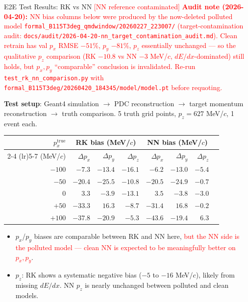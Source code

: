 \documentclass[aspectratio=169]{beamer}
\begin{document}
\begin{frame}{E2E Test Results: RK vs NN \textcolor{red}{[NN reference contaminated]}}
\small
\textcolor{red}{\textbf{Audit note (2026-04-20):} NN bias columns below were produced
by the now-deleted polluted model \texttt{formal\_B115T3deg\_qmdwindow/20260227\_223007/}
(target-contamination audit: \texttt{docs/audit/2026-04-20-nn\_target\_contamination\_audit.md}).
Clean retrain has val $p_x$ RMSE $-51\%$, $p_y$ $-81\%$, $p_z$ essentially unchanged ---
so the qualitative $p_z$ comparison (RK $-10.8$ vs NN $-3$ MeV/$c$, $dE/dx$-dominated) still
holds, but $p_x,p_y$ ``comparable'' conclusion is invalidated. Re-run
\texttt{test\_rk\_nn\_comparison.py} with
\texttt{formal\_B115T3deg/20260420\_184345/model/model.pt} before requoting.}

\textbf{Test setup}: Geant4 simulation $\to$ PDC reconstruction $\to$ target momentum reconstruction $\to$ truth comparison. 5 truth grid points, $p_z = 627$ MeV/$c$, 1 event each.

\begin{table}
\centering
\begin{tabular}{rrrrrrrr}
\toprule
$p_x^\mathrm{true}$ & \multicolumn{3}{c}{RK bias (MeV/$c$)} & \multicolumn{3}{c}{NN bias (MeV/$c$)} \\
\cmidrule(lr){2-4} \cmidrule(lr){5-7}
(MeV/$c$) & $\Delta p_x$ & $\Delta p_y$ & $\Delta p_z$ & $\Delta p_x$ & $\Delta p_y$ & $\Delta p_z$ \\
\midrule
$-100$ & $-7.3$ & $-13.4$ & $-16.1$ & $-6.2$ & $-13.0$ & $-5.4$ \\
$-50$ & $-20.4$ & $-25.5$ & $-10.8$ & $-20.5$ & $-24.9$ & $-0.7$ \\
$0$ & $3.3$ & $-3.9$ & $-13.1$ & $3.5$ & $-3.8$ & $-3.0$ \\
$+50$ & $-33.3$ & $16.3$ & $-8.7$ & $-31.4$ & $16.8$ & $-0.2$ \\
$+100$ & $-37.8$ & $-20.9$ & $-5.3$ & $-43.6$ & $-19.4$ & $6.3$ \\
\bottomrule
\end{tabular}
\end{table}

\begin{itemize}
\item $p_x$/$p_y$ biases are comparable between RK and NN here, \textcolor{red}{but the NN side is the polluted model --- clean NN is expected to be meaningfully better on $p_x,p_y$}.
\item $p_z$: RK shows a systematic negative bias ($-5$ to $-16$ MeV/$c$), likely from missing $dE/dx$. NN $p_z$ is nearly unchanged between polluted and clean models.
\end{itemize}
\end{frame}
\end{document}
